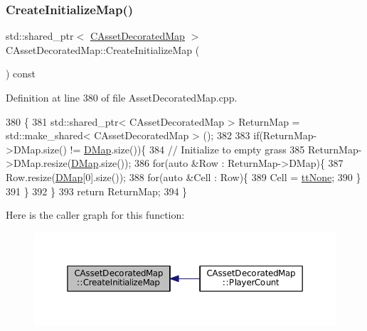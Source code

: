 \hypertarget{classCAssetDecoratedMap_a2807be3f5fe7858f476b80fef228fa03}{}\label{classCAssetDecoratedMap_a2807be3f5fe7858f476b80fef228fa03} 
\subsubsection{\texorpdfstring{Create\+Initialize\+Map()}{CreateInitializeMap()}}
{\footnotesize\ttfamily std\+::shared\+\_\+ptr$<$ \hyperlink{classCAssetDecoratedMap}{C\+Asset\+Decorated\+Map} $>$ C\+Asset\+Decorated\+Map\+::\+Create\+Initialize\+Map (\begin{DoxyParamCaption}{ }\end{DoxyParamCaption}) const}



Definition at line 380 of file Asset\+Decorated\+Map.\+cpp.


\begin{DoxyCode}
380                                                                                  \{
381     std::shared\_ptr< CAssetDecoratedMap > ReturnMap = std::make\_shared< CAssetDecoratedMap > ();
382     
383     \textcolor{keywordflow}{if}(ReturnMap->DMap.size() != \hyperlink{classCTerrainMap_a80d154ce478948b10473534a7bca13f6}{DMap}.size())\{
384         \textcolor{comment}{// Initialize to empty grass}
385         ReturnMap->DMap.resize(\hyperlink{classCTerrainMap_a80d154ce478948b10473534a7bca13f6}{DMap}.size());
386         \textcolor{keywordflow}{for}(\textcolor{keyword}{auto} &Row : ReturnMap->DMap)\{
387             Row.resize(\hyperlink{classCTerrainMap_a80d154ce478948b10473534a7bca13f6}{DMap}[0].size());
388             \textcolor{keywordflow}{for}(\textcolor{keyword}{auto} &Cell : Row)\{
389                 Cell = \hyperlink{classCTerrainMap_aff2ab991e237269941416dd79d8871d4a481e779132fb16414d17870bd6229eb5}{ttNone};
390             \}
391         \}
392     \}
393     \textcolor{keywordflow}{return} ReturnMap;
394 \}
\end{DoxyCode}
Here is the caller graph for this function\+:\nopagebreak
\begin{figure}[H]
\begin{center}
\leavevmode
\includegraphics[width=350pt]{classCAssetDecoratedMap_a2807be3f5fe7858f476b80fef228fa03_icgraph}
\end{center}
\end{figure}
\hypertarget{classCAssetDecoratedMap_aa05e81ec37b4217053e8de050e47dba7}{}\label{classCAssetDecoratedMap_aa05e81ec37b4217053e8de050e47dba7} 
